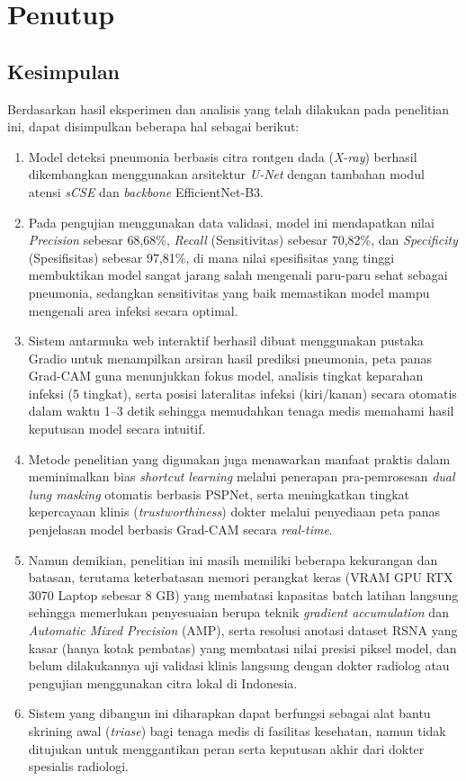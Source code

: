 \documentclass[12pt,a4paper,oneside]{book}
\begin{document}
\chapter[PENUTUP]{Penutup}

\section{Kesimpulan}

Berdasarkan hasil eksperimen dan analisis yang telah dilakukan pada penelitian ini, dapat disimpulkan beberapa hal sebagai berikut:
\begin{enumerate}
  \item Model deteksi pneumonia berbasis citra rontgen dada (\textit{X-ray}) berhasil dikembangkan menggunakan arsitektur \textit{U-Net} dengan tambahan modul atensi \textit{sCSE} dan \textit{backbone} EfficientNet-B3.
  \item Pada pengujian menggunakan data validasi, model ini mendapatkan nilai \textit{Precision} sebesar 68,68\%, \textit{Recall} (Sensitivitas) sebesar 70,82\%, dan \textit{Specificity} (Spesifisitas) sebesar 97,81\%, di mana nilai spesifisitas yang tinggi membuktikan model sangat jarang salah mengenali paru-paru sehat sebagai pneumonia, sedangkan sensitivitas yang baik memastikan model mampu mengenali area infeksi secara optimal.
  \item Sistem antarmuka web interaktif berhasil dibuat menggunakan pustaka Gradio untuk menampilkan arsiran hasil prediksi pneumonia, peta panas Grad-CAM guna menunjukkan fokus model, analisis tingkat keparahan infeksi (5 tingkat), serta posisi lateralitas infeksi (kiri/kanan) secara otomatis dalam waktu 1--3 detik sehingga memudahkan tenaga medis memahami hasil keputusan model secara intuitif.
  \item Metode penelitian yang digunakan juga menawarkan manfaat praktis dalam meminimalkan bias \textit{shortcut learning} melalui penerapan pra-pemrosesan \textit{dual lung masking} otomatis berbasis PSPNet, serta meningkatkan tingkat kepercayaan klinis (\textit{trustworthiness}) dokter melalui penyediaan peta panas penjelasan model berbasis Grad-CAM secara \textit{real-time}.
  \item Namun demikian, penelitian ini masih memiliki beberapa kekurangan dan batasan, terutama keterbatasan memori perangkat keras (VRAM GPU RTX 3070 Laptop sebesar 8 GB) yang membatasi kapasitas batch latihan langsung sehingga memerlukan penyesuaian berupa teknik \textit{gradient accumulation} dan \textit{Automatic Mixed Precision} (AMP), serta resolusi anotasi dataset RSNA yang kasar (hanya kotak pembatas) yang membatasi nilai presisi piksel model, dan belum dilakukannya uji validasi klinis langsung dengan dokter radiolog atau pengujian menggunakan citra lokal di Indonesia.
  \item Sistem yang dibangun ini diharapkan dapat berfungsi sebagai alat bantu skrining awal (\textit{triase}) bagi tenaga medis di fasilitas kesehatan, namun tidak ditujukan untuk menggantikan peran serta keputusan akhir dari dokter spesialis radiologi.
\end{enumerate}
\end{document}

